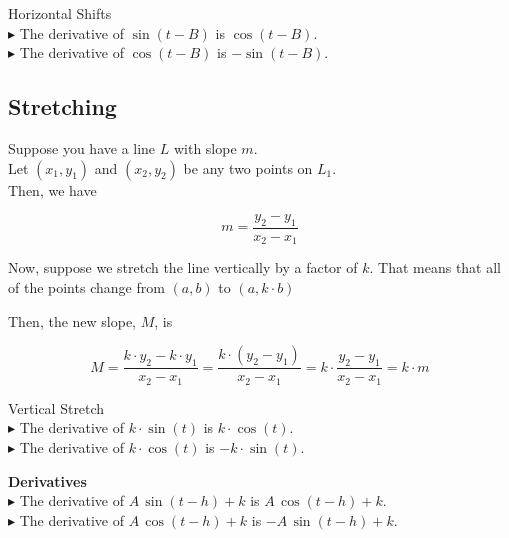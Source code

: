 \documentclass{ximera}
\begin{document}
\begin{observation} Horizontal Shifts \\

$\blacktriangleright$ The derivative of $\sin(t - B)$ is $\cos(t - B)$. \\

$\blacktriangleright$ The derivative of $\cos(t - B)$ is $-\sin(t - B)$. \\

\end{observation}















\subsection{Stretching}


Suppose you have a line $L$ with slope $m$. \\

Let $(x_1, y_1)$ and $(x_2, y_2)$ be any two points on $L_1$. \\

Then, we have


\[
m = \frac{y_2 - y_1}{x_2 - x_1}
\]






Now, suppose we stretch the line vertically by a factor of $k$.  That means that all of the points change from $(a, b)$ to $(a, k \cdot b)$

Then, the new slope, $M$, is 



\[
M = \frac{k \cdot y_2 - k \cdot y_1}{x_2 - x_1} = \frac{k \cdot (y_2 - y_1)}{x_2 - x_1} = k \cdot \frac{y_2 - y_1}{x_2 - x_1} = k \cdot m
\]





\begin{observation} Vertical Stretch \\

$\blacktriangleright$ The derivative of $k \cdot \sin(t)$ is $k \cdot \cos(t)$. \\

$\blacktriangleright$ The derivative of $k \cdot \cos(t)$ is $-k \cdot \sin(t)$. \\

\end{observation}











\begin{theorem} \textbf{\textcolor{green!50!black}{Derivatives}}  \\

$\blacktriangleright$ The derivative of $A \, \sin(t - h) + k$ is $A \, \cos(t - h) + k$. \\

$\blacktriangleright$ The derivative of $A \, \cos(t - h) + k$ is $-A \, \sin(t - h) + k$. \\

\end{theorem}
\end{document}
